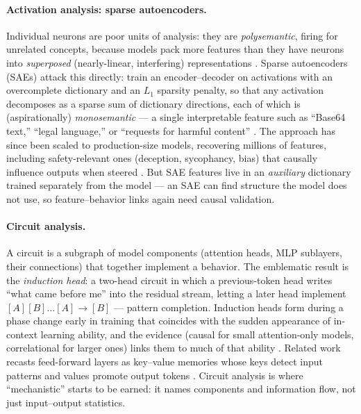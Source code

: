 \documentclass[11pt]{article}
\begin{document}
\paragraph{Activation analysis: sparse autoencoders.} Individual neurons are poor units of analysis: they are \emph{polysemantic}, firing for unrelated concepts, because models pack more features than they have neurons into \emph{superposed} (nearly-linear, interfering) representations \cite{elhage2022toy}. Sparse autoencoders (SAEs) attack this directly: train an encoder--decoder on activations with an overcomplete dictionary and an $L_1$ sparsity penalty, so that any activation decomposes as a sparse sum of dictionary directions, each of which is (aspirationally) \emph{monosemantic} --- a single interpretable feature such as ``Base64 text,'' ``legal language,'' or ``requests for harmful content'' \cite{bricken2023monosemanticity}. The approach has since been scaled to production-size models, recovering millions of features, including safety-relevant ones (deception, sycophancy, bias) that causally influence outputs when steered \cite{templeton2024scaling}. But SAE features live in an \emph{auxiliary} dictionary trained separately from the model --- an SAE can find structure the model does not use, so feature--behavior links again need causal validation.

\paragraph{Circuit analysis.} A circuit is a subgraph of model components (attention heads, MLP sublayers, their connections) that together implement a behavior. The emblematic result is the \emph{induction head}: a two-head circuit in which a previous-token head writes ``what came before me'' into the residual stream, letting a later head implement $[A][B]\ldots[A]\rightarrow[B]$ --- pattern completion. Induction heads form during a phase change early in training that coincides with the sudden appearance of in-context learning ability, and the evidence (causal for small attention-only models, correlational for larger ones) links them to much of that ability \cite{olsson2022context}. Related work recasts feed-forward layers as key--value memories whose keys detect input patterns and values promote output tokens \cite{geva2021transformer}. Circuit analysis is where ``mechanistic'' starts to be earned: it names components and information flow, not just input--output statistics.
\end{document}
